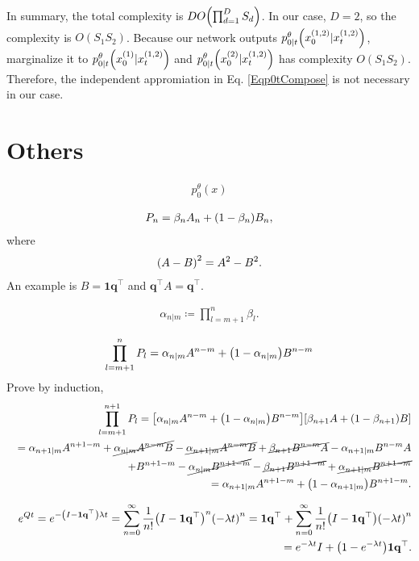 \documentclass[10pt]{article}
\begin{document}
In summary, the total complexity is $DO\qty(\prod_{d=1}^D S_d)$. In our case, $D=2$, so the complexity is $O(S_1S_2)$. Because our network outputs $p^\theta_{0|t}\qty(x^{(1,2)}_0|x^{(1,2)}_t)$, marginalize it to $p^\theta_{0|t}\qty(x^{(1)}_0|x^{(1,2)}_t)$ and $p^\theta_{0|t}\qty(x^{(2)}_0|x^{(1,2)}_t)$ has complexity $O(S_1S_2)$. Therefore, the independent appromiation in Eq. \eqref{Eqp0tCompose} is not necessary in our case.

\section{Others}

\begin{eqnarray}
  p_0^{\theta}(x)
\end{eqnarray}


\begin{eqnarray*}
  P_n=\beta_n A_n + \qty(1-\beta_n)B_n,
\end{eqnarray*}
where
\begin{eqnarray*}
  \qty(A-B)^2 = A^2-B^2.
\end{eqnarray*}
An example is $B=\mathbf{1q}^\top$ and $\mathbf{q}^\top A=\mathbf{q}^\top$.

\begin{eqnarray*}
  \alpha_{n|m} \coloneq \prod_{l=m+1}^n \beta_l.
\end{eqnarray*}

\begin{eqnarray*}
  \prod_{l=m+1}^n P_l=\alpha_{n|m}A^{n-m} + \qty(1-\alpha_{n|m})B^{n-m}
\end{eqnarray*}
Prove by induction,
\begin{eqnarray*}
  &&\prod_{l=m+1}^{n+1} P_l=\qty[\alpha_{n|m}A^{n-m} + \qty(1-\alpha_{n|m})B^{n-m}]\qty[\beta_{n+1} A + \qty(1-\beta_{n+1})B]\\
  &&=\alpha_{n+1|m}A^{n+1-m} + \cancel{\alpha_{n|m}A^{n-m}B} - \cancel{\alpha_{n+1|m}A^{n-m}B} + \cancel{\beta_{n+1}B^{n-m}A} - \alpha_{n+1|m}B^{n-m}A\\
  &&+ B^{n+1-m} - \cancel{\alpha_{n|m}B^{n+1-m}} - \cancel{\beta_{n+1}B^{n+1-m}} + \cancel{\alpha_{n+1|m}B^{n+1-m}}\\
  &&=\alpha_{n+1|m}A^{n+1-m} + \qty(1-\alpha_{n+1|m})B^{n+1-m}.
\end{eqnarray*}

\begin{eqnarray*}
  &&e^{Qt}=e^{-\qty(I-\mathbf{1q}^\top)\lambda t}=\sum_{n=0}^\infty\frac{1}{n!}\qty(I-\mathbf{1q}^\top)^n\qty(-\lambda t)^n=\mathbf{1q}^\top+\sum_{n=0}^\infty\frac{1}{n!}\qty(I - \mathbf{1q}^\top)\qty(-\lambda t)^n\\
  &&=e^{-\lambda t} I + \qty(1-e^{-\lambda t})\mathbf{1q}^\top.
\end{eqnarray*}
\end{document}
